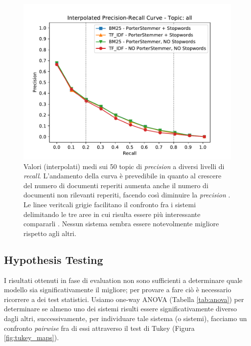 \documentclass[letterpaper, 10 pt, conference]{ieeeconf}  %
\begin{document}
\begin{figure}[h]
    \centering
    \includegraphics[scale=0.55]{figures/iprc.pdf}
    
    \caption{Valori (interpolati) medi sui 50 topic di \textit{precision} a diversi livelli di \textit{recall}. L'andamento della curva è prevedibile in quanto al crescere del numero di documenti reperiti aumenta anche il numero di documenti non rilevanti reperiti, facendo così diminuire la \textit{precision} \cite{measures}. Le linee veritcali grigie facilitano il confronto fra i sistemi delimitando le tre aree in cui risulta essere più interessante compararli \cite{measures}. Nessun sistema sembra essere notevolmente migliore rispetto agli altri.}
    \label{fig:iprc}
\end{figure}


\subsection{Hypothesis Testing}
I risultati ottenuti in fase di evaluation non sono sufficienti a determinare quale modello sia significativamente il migliore; per provare a fare ciò è necessario ricorrere a dei test statistici. Usiamo one-way ANOVA (Tabella \ref{tab:anova}) per determinare se almeno uno dei sistemi risulti essere significativamente diverso dagli altri, successivamente, per individuare tale sistema (o sistemi), facciamo un confronto \textit{pairwise} fra di essi attraverso il test di Tukey (Figura \ref{fig:tukey_maps}).
\end{document}

